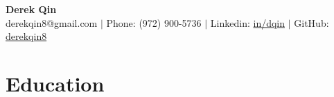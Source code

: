 \documentclass[letterpaper,11pt]{article}
\makeatletter
\newcommand{\resitem}[1]{\item[--] #1}
\newcommand{\edusubheading}[3]{
	\vspace{3pt}
	\begin{tabular*}{7.5in}{l@{\extracolsep{\fill}}r}
		\textbf{#1}, #2 & \textit{#3} \\
	\end{tabular*}
	}
\makeatother
\begin{document}
\begin{center}
	\textbf{\huge Derek Qin}\\
	derekqin8@gmail.com $|$ Phone: (972) 900-5736 $|$ Linkedin:
	\href{https://www.linkedin.com/in/dqin}{in/dqin} $|$ GitHub:
	\href{https://www.github.com/derekqin8}{derekqin8}
\end{center}

\section{Education}


%

\end{document}
